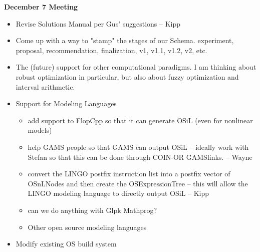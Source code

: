 \documentclass[11pt]{article}
\begin{document}
\begin{center}
{\bf December 7 Meeting}
\end{center}

\begin{itemize}

\item Revise Solutions Manual per Gus' suggestions -- Kipp


\item  Come up with a way to "stamp" the stages of our Schema.
experiment, proposal, recommendation, finalization, v1, v1.1, v1.2, v2, etc. 

\item The (future) support
for other computational paradigms. I am thinking about robust optimization in
particular, but also about fuzzy optimization and interval arithmetic.

\item Support for Modeling Languages

\begin{itemize}
\item  add support to FlopCpp so that it can generate OSiL (even for nonlinear models)

\item help GAMS people so that GAMS can output OSiL -- ideally work with Stefan so that this can be done through COIN-OR GAMSlinks. -- Wayne


\item convert the LINGO postfix instruction list into a postfix vector of OSnLNodes and then create the OSExpressionTree -- this will allow the LINGO modeling language to directly output OSiL -- Kipp

\item can we do anything with Glpk Mathprog?

\item Other open source modeling languages
\end{itemize}



\item Modify existing OS build system

\begin{itemize}


\end{itemize}
\end{itemize}
\end{document}
